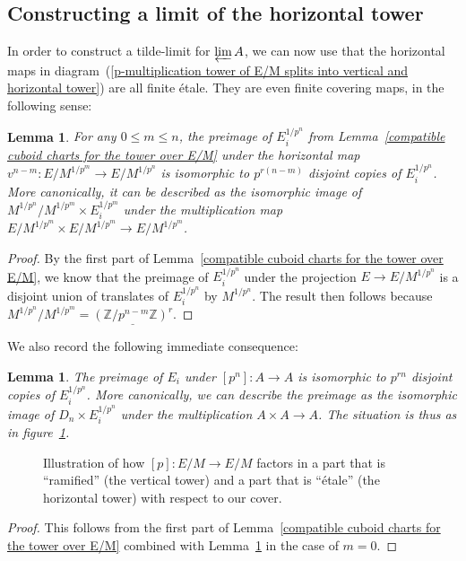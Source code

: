 \documentclass[10pt,oneside]{amsart}
\newtheorem{lemma}[theorem]{Lemma}
\theoremstyle{definition}
\theoremstyle{remark}
\begin{document}
	\subsection{Constructing a limit of the horizontal tower}
	In order to construct a tilde-limit for $\varprojlim A$, we can now use that the horizontal maps in diagram~(\ref{p-multiplication tower of E/M splits into vertical and horizontal tower}) are all finite \'etale. They are even finite covering maps, in the following sense:
	\begin{lemma}\label{horizontal map is covering map}
		For any $0\leq m\leq n$, the preimage of $E_i^{1/p^n}$ from Lemma~\ref{compatible cuboid charts for the tower over E/M} under the horizontal map $v^{n-m}:E/M^{1/p^{m}}\rightarrow E/M^{1/p^n}$ is isomorphic to $p^{r(n-m)}$ disjoint copies of $E_i^{1/p^n}$. More canonically, it can be described as the isomorphic image of $M^{1/p^n}/M^{1/p^m}\times E_i^{1/p^m}$ under the multiplication map $E/M^{1/p^m}\times E/M^{1/p^m}\rightarrow E/M^{1/p^m}$.
	\end{lemma}
	\begin{proof}
		By the first part of Lemma~\ref{compatible cuboid charts for the tower over E/M}, we know that the preimage of $E_i^{1/p^n}$ under the projection $E\rightarrow E/M^{1/p^n}$ is a disjoint union of translates of $E_i^{1/p^n}$ by $M^{1/p^{n}}$. The result then follows because $M^{1/p^{n}}/M^{1/p^{m}} =  \underline{(\mathbb Z/p^{n-m}\mathbb Z)^r}$.
	\end{proof}
	We also record the following immediate consequence:
	
	\begin{lemma}\label{preimage of E_i under p^n is disjoint copies}
		The preimage of $E_i$ under $[p^n]:A\rightarrow A$ is isomorphic to $p^{rn}$ disjoint copies of $E_i^{1/p^n}$. More canonically, we can describe the preimage as the isomorphic image of  $D_n \times E_i^{1/p^n}$ under the multiplication $A\times A\rightarrow A$. The situation is thus as in figure~\ref{local-glueing-[p]-tikzpicture}.
	\end{lemma}
	\begin{figure}
		
		\caption{Illustration of how $[p]:E/M\rightarrow E/M$ factors in a part that is ``ramified'' (the vertical tower) and a part that is ``\'etale'' (the horizontal tower) with respect to our cover.}
		\label{local-glueing-[p]-tikzpicture}
	\end{figure}
	\begin{proof}
		This follows from the first part of Lemma~\ref{compatible cuboid charts for the tower over E/M} combined with Lemma~\ref{horizontal map is covering map} in the case of $m=0$.
	\end{proof}
	
\end{document}
